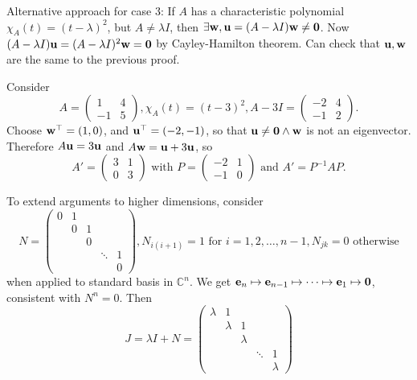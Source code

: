 \documentclass[10pt]{article}
\begin{document}
    Alternative approach for case 3: If $A$ has a characteristic polynomial $ \chi_A(t)=(t-\lambda)^2 $, but $ A\neq \lambda I$, then $ \exists {\bf w}, {\bf u}=(A-\lambda I){\bf w} \neq \mathbf{0} $. Now $ (A-\lambda I){\bf u}=(A-\lambda I)^2{\bf w} = \mathbf{0} $ by Cayley-Hamilton theorem. Can check that ${\bf u},{\bf w}$ are the same to the previous proof.
    \begin{example}
        Consider 
        \[
            A=\begin{pmatrix}
                1&4\\
                -1&5
            \end{pmatrix}, \chi_A(t)=(t-3)^2, A-3I = \begin{pmatrix}
                -2&4\\
                -1&2
            \end{pmatrix}.
        \]
        Choose $ {\bf w}^\top=(1,0) $, and ${\bf u}^\top=(-2,-1)$, so that ${\bf u}\neq \mathbf{0}\land {\bf w}$ is not an eigenvector. Therefore $A{\bf u}=3{\bf u}$ and $A{\bf w}={\bf u}+3{\bf u}$, so 
        \[
            A'=\begin{pmatrix}
                3&1\\
                0&3
            \end{pmatrix} \text{ with }P = \begin{pmatrix}
                -2&1\\
                -1&0
            \end{pmatrix} \text{ and } A'=P^{-1}AP.
        \] 
    \end{example}
    To extend arguments to higher dimensions, consider 
    \[
        N = \begin{pmatrix}
            0&1&&&\\
            &0&1&&\\
            &&0&&\\
            &&&\ddots&1\\
            &&&&0
        \end{pmatrix}, N_{i(i+1)}=1 \text{ for } i=1,2,\dots,n-1, N_{jk}=0 \text{ otherwise}
    \]
    when applied to standard basis in $ \mathbb{C}^{n} $. We get $ {\bf e}_n \mapsto {\bf e}_{n-1} \mapsto \cdots \mapsto {\bf e}_1 \mapsto \mathbf{0} $, consistent with $ N^n=0 $. Then
    \[
        J=\lambda I+N = \begin{pmatrix}
            \lambda&1&&&\\
            &\lambda&1&&\\
            &&\lambda&&\\
            &&&\ddots&1\\
            &&&&\lambda
        \end{pmatrix}
    \]
\end{document}

